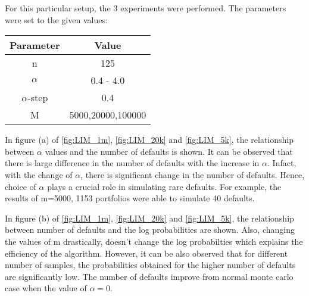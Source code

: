 For this particular setup, the 3 experiments were performed. The parameters were set to the given values:
\begin{center}
	\begin{tabular}{|c|c|}
		\hline
		Parameter      & Value                              \\
		\hline
		\hline
		n & 125 \\
		\hline
		$\alpha$ & 0.4 - 4.0 \\
		\hline
		$\alpha$-step & 0.4 \\
		\hline
		M & 5000,20000,100000 \\
		\hline
	\end{tabular}
\end{center}

In figure (a) of \ref{fig:LIM_1m}, \ref{fig:LIM_20k} and \ref{fig:LIM_5k}, the relationship between $\alpha$ values and the number of defaults is shown. It can be observed that there is large difference in the number of defaults with the increase in $\alpha$. Infact, with the change of $\alpha$, there is significant change in the number of defaults. Hence, choice of $\alpha$ plays a crucial role in simulating rare defaults. For example, the results of m=5000, 1153 portfolios were able to simulate 40 defaults. 

In figure (b) of \ref{fig:LIM_1m}, \ref{fig:LIM_20k} and \ref{fig:LIM_5k}, the relationship between number of defaults and the log probabilities are shown. Also, changing the values of m drastically, doesn't change the log probabilties which explains the efficiency of the algorithm. However, it can be also observed that for different number of samples, the probabilities obtained for the higher number of defaults are significantly low. The number of defaults improve from normal monte carlo case when the value of $\alpha=0$. 